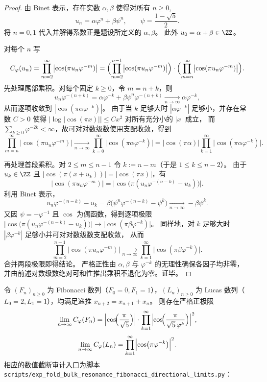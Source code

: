 \begin{proof}
由 Binet 表示，存在实数 \(\alpha,\beta\) 使得对所有 \(n\ge 0\),
\[
u_n=\alpha\varphi^n+\beta\psi^n,
\qquad
\psi=\frac{1-\sqrt5}{2}.
\]
将 \(n=0,1\) 代入并解得系数正是题设所定义的 \(\alpha,\beta\)。
此外 \(u_0=\alpha+\beta\in\ZZ\)。
\par
对每个 \(n\) 写
\[
C_\varphi(u_n)=\prod_{m=2}^{\infty}\bigl|\cos(\pi u_n\varphi^{-m})\bigr|
=\Bigl(\prod_{m=2}^{n-1}\bigl|\cos(\pi u_n\varphi^{-m})\bigr|\Bigr)\cdot
\Bigl(\prod_{m=n}^{\infty}\bigl|\cos(\pi u_n\varphi^{-m})\bigr|\Bigr).
\]
先处理尾部乘积。对每个固定 \(k\ge 0\)，令 \(m=n+k\)，则
\[
u_n\varphi^{-(n+k)}
=\alpha\varphi^{-k}+\beta\psi^n\varphi^{-(n+k)}
\xrightarrow[n\to\infty]{}\alpha\varphi^{-k},
\]
从而逐项收敛到 \(|\cos(\pi\alpha\varphi^{-k})|\)。
由于当 \(k\) 足够大时 \(|\alpha\varphi^{-k}|\) 足够小，并存在常数 \(C>0\) 使得
\(
|\log|\cos(\pi x)||\le Cx^2
\)
对所有充分小的 \(|x|\) 成立，
而 \(\sum_{k\ge 0}\varphi^{-2k}<\infty\)，故可对对数级数使用支配收敛，得到
\[
\prod_{m=n}^{\infty}\bigl|\cos(\pi u_n\varphi^{-m})\bigr|
\xrightarrow[n\to\infty]{}
\prod_{k=0}^{\infty}\bigl|\cos(\pi\alpha\varphi^{-k})\bigr|
=\bigl|\cos(\pi\alpha)\bigr|\prod_{k=1}^{\infty}\bigl|\cos(\pi\alpha\varphi^{-k})\bigr|.
\]
\par
再处理首段乘积。对 \(2\le m\le n-1\) 令 \(k:=n-m\)（于是 \(1\le k\le n-2\)）。
由于 \(u_k\in\ZZ\) 且 \(|\cos(\pi(x+u_k))|=|\cos(\pi x)|\)，有
\[
\bigl|\cos(\pi u_n\varphi^{-m})\bigr|
=\bigl|\cos\bigl(\pi(u_n\varphi^{-(n-k)}-u_k)\bigr)\bigr|.
\]
利用 Binet 表示，
\[
u_n\varphi^{-(n-k)}-u_k
=\beta\bigl(\psi^n\varphi^{-(n-k)}-\psi^k\bigr)
\xrightarrow[n\to\infty]{}-\beta\psi^k.
\]
又因 \(\psi=-\varphi^{-1}\) 且 \(\cos\) 为偶函数，得到逐项极限
\(
\bigl|\cos\bigl(\pi(u_n\varphi^{-(n-k)}-u_k)\bigr)\bigr|
\to
\bigl|\cos(\pi\beta\varphi^{-k})\bigr|
\)。
同样地，对 \(k\) 足够大时 \(|\beta\varphi^{-k}|\) 足够小并可对对数级数支配收敛，
从而
\[
\prod_{m=2}^{n-1}\bigl|\cos(\pi u_n\varphi^{-m})\bigr|
\xrightarrow[n\to\infty]{}
\prod_{k=1}^{\infty}\bigl|\cos(\pi\beta\varphi^{-k})\bigr|.
\]
合并两段极限即得结论。
严格正性由 \(\alpha,\beta\) 与 \(\varphi^{-k}\) 的无理性确保各因子均非零，
并由前述对数级数绝对可和性推出乘积不退化为零。证毕。
\end{proof}

\begin{corollary}\label{cor:fold-resonance-ladder-fib-luc-limits}
令 \((F_n)_{n\ge 0}\) 为 Fibonacci 数列（\(F_0=0,F_1=1\)），\((L_n)_{n\ge 0}\) 为 Lucas 数列（\(L_0=2,L_1=1\)），均满足递推 \(x_{n+2}=x_{n+1}+x_n\)。
则存在严格正极限
\[
\lim_{n\to\infty}C_\varphi(F_n)
=\Bigl|\cos\!\Bigl(\frac{\pi}{\sqrt5}\Bigr)\Bigr|
\cdot \prod_{k=1}^{\infty}\Bigl|\cos\!\Bigl(\frac{\pi}{\sqrt5\,\varphi^{k}}\Bigr)\Bigr|^{2},
\]
\[
\lim_{n\to\infty}C_\varphi(L_n)
=\prod_{k=1}^{\infty}\Bigl|\cos\bigl(\pi\varphi^{-k}\bigr)\Bigr|^{2}.
\]
相应的数值截断审计入口为脚本 \texttt{scripts/exp\_fold\_bulk\_resonance\_fibonacci\_directional\_limits.py}：

\end{corollary}

